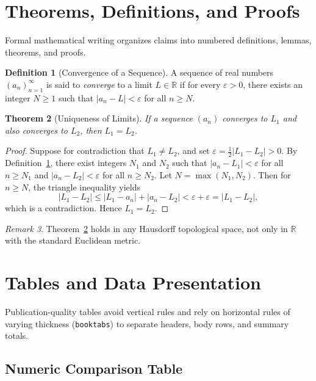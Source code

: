 \documentclass[11pt, a4paper]{article}
\theoremstyle{plain}
\newtheorem{theorem}{Theorem}[section]
\theoremstyle{definition}
\newtheorem{definition}[theorem]{Definition}
\theoremstyle{remark}
\newtheorem{remark}[theorem]{Remark}
\begin{document}
\section{Theorems, Definitions, and Proofs}
\label{sec:theorems}

Formal mathematical writing organizes claims into numbered definitions, lemmas, theorems, and proofs.

\begin{definition}[Convergence of a Sequence]
\label{def:convergence}
A sequence of real numbers $(a_n)_{n=1}^{\infty}$ is said to \emph{converge} to a limit $L \in \mathbb{R}$ if for every $\varepsilon > 0$, there exists an integer $N \ge 1$ such that $|a_n - L| < \varepsilon$ for all $n \ge N$.
\end{definition}

\begin{theorem}[Uniqueness of Limits]
\label{thm:uniqueness}
If a sequence $(a_n)$ converges to $L_1$ and also converges to $L_2$, then $L_1 = L_2$.
\end{theorem}

\begin{proof}
Suppose for contradiction that $L_1 \neq L_2$, and set $\varepsilon = \frac{1}{2}|L_1 - L_2| > 0$. By Definition~\ref{def:convergence}, there exist integers $N_1$ and $N_2$ such that $|a_n - L_1| < \varepsilon$ for all $n \ge N_1$ and $|a_n - L_2| < \varepsilon$ for all $n \ge N_2$. Let $N = \max(N_1, N_2)$. Then for $n \ge N$, the triangle inequality yields
\[
  |L_1 - L_2| \le |L_1 - a_n| + |a_n - L_2| < \varepsilon + \varepsilon = |L_1 - L_2|,
\]
which is a contradiction. Hence $L_1 = L_2$.
\end{proof}

\begin{remark}
Theorem~\ref{thm:uniqueness} holds in any Hausdorff topological space, not only in $\mathbb{R}$ with the standard Euclidean metric.
\end{remark}

\section{Tables and Data Presentation}
\label{sec:tables}

Publication-quality tables avoid vertical rules and rely on horizontal rules of varying thickness (\texttt{booktabs}) to separate headers, body rows, and summary totals.

\subsection{Numeric Comparison Table}
\end{document}
